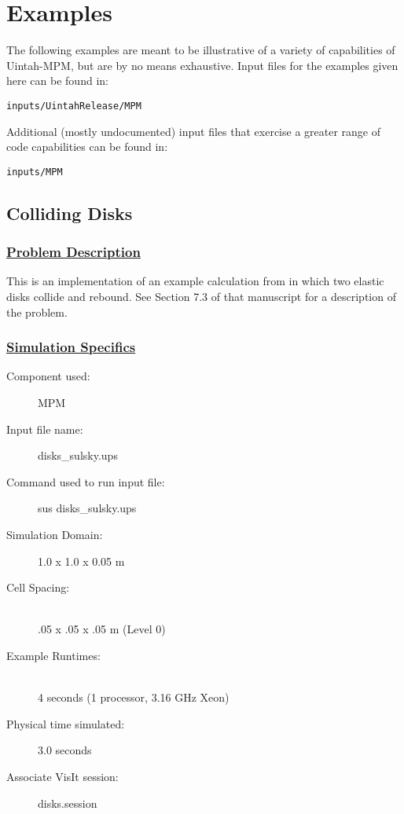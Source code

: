 %
\section{Examples} \label{Sec:ExamplesMPM}

The following examples are meant to be illustrative of a variety of
capabilities of Uintah-MPM, but are by no means exhaustive.  Input files
for the examples given here can be found in:
\begin{Verbatim}[fontsize=\footnotesize]
inputs/UintahRelease/MPM
\end{Verbatim}

Additional (mostly undocumented) input files that exercise a greater range
of code capabilities can be found in:
\begin{Verbatim}[fontsize=\footnotesize]
inputs/MPM
\end{Verbatim}


\subsection*{\center Colliding Disks}
\subsubsection*{\underline{Problem Description}}
This is an implementation of an example calculation from \cite{sulskycmame} in
which two elastic disks collide and rebound.  See Section 7.3 of that
manuscript for a description of the problem.
 
\subsubsection*{\underline{Simulation Specifics}}
\begin{description} 
\item [Component used:] \hfill MPM
\item [Input file name:] \hfill disks\_sulsky.ups
\item [Command used to run input file:]\hfill sus disks\_sulsky.ups
\item [Simulation Domain:]\hfill    1.0 x 1.0 x 0.05 m

\item [Cell Spacing:]\hfill \\ 
.05 x .05 x .05 m (Level 0)

\item [Example Runtimes:] \hfill \\
 4 seconds  (1 processor, 3.16 GHz Xeon)\\

\item [Physical time simulated:] \hfill 3.0 seconds

\item [Associate VisIt session:] \hfill disks.session

\end{description}

